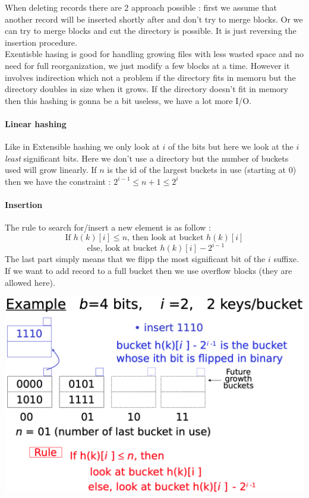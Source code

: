 \documentclass[12pt,a4paper]{article}
\begin{document}
When deleting records there are 2 approach possible : first we assume that another record will be inserted shortly after and don't try to merge blocks. Or we can try to merge blocks and cut the directory is possible. It is just reversing the insertion procedure.\\

Exentisble hasing is good for handling growing files with less wasted space and no need for full reorganization, we just modify a few blocks at a time. However it involves indirection which not a problem if the directory fits in memoru but the directory doubles in size when it grows. If the directory doesn't fit in memory then this hashing is gonna be a bit useless, we have a lot more I/O.

\paragraph{Linear hashing}
Like in Extensible hashing we only look at $i$ of the bits but here we look at the $i$ \emph{least} significant bits. Here we don't use a directory but the number of buckets used will grow linearly. If $n$ is the id of the largest buckets in use (starting at 0) then we have the constraint : $2^{i-1} \leq n+1 \leq 2^i$\\

\paragraph{Insertion}
The rule to search for/insert a new element is as follow : \\
$$\text{If } h(k)[i] \leq n \text{, then look at bucket } h(k)[i]$$
$$\text{ else, look at bucket } h(k)[i] - 2^{i-1}$$
The last part simply means that we flipp the most significant bit of the $i$ suffixe. If we want to add record to a full bucket then we use overflow blocks (they are allowed here).
\begin{center}
\includegraphics[scale=0.25]{img/img47.png}
\end{center}
\end{document}
